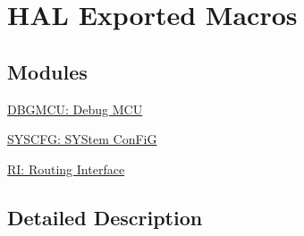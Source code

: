 \hypertarget{group___h_a_l___exported___macros}{\section{H\-A\-L Exported Macros}
\label{group___h_a_l___exported___macros}
}
\subsection*{Modules}
\begin{DoxyCompactItemize}
\item 
\hyperlink{group___d_b_g_m_c_u___macros}{D\-B\-G\-M\-C\-U\-: Debug M\-C\-U}
\item 
\hyperlink{group___s_y_s_c_f_g___macros}{S\-Y\-S\-C\-F\-G\-: S\-Y\-Stem Con\-Fi\-G}
\item 
\hyperlink{group___r_i___macris}{R\-I\-: Routing Interface}
\end{DoxyCompactItemize}


\subsection{Detailed Description}

